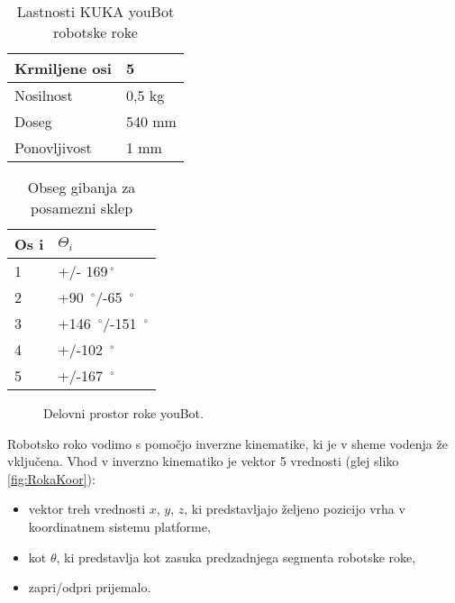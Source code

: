 \vspace{0.5cm}

\begin{table}
\caption{Lastnosti KUKA youBot robotske roke}
\begin{tabular}{|l|l|}
\hline Krmiljene osi & 5 \\
\hline Nosilnost &	0,5 kg \\
\hline Doseg &	540 mm \\
\hline Ponovljivost & 	1 mm \\ \hline
\end{tabular}
\end{table}


\begin{table}
\caption{Obseg gibanja za posamezni sklep}
\begin{tabular}{|l|l|}
\hline Os i & $\Theta_i$ \\
\hline 1 &	+/- 169$\,^{\circ}$ \\
\hline 2 &	+90 $\,^{\circ}$/-65 $\,^{\circ}$ \\
\hline 3 & 	+146 $\,^{\circ}$/-151 $\,^{\circ}$ \\
\hline 4 & 	+/-102 $ \,^{\circ}$ \\
\hline 5 & 	+/-167 $ \,^{\circ}$ \\ \hline
\end{tabular}
\end{table}

\vspace{0.5cm}

\begin{figure}[h]
\centering {}
\caption{Delovni prostor roke youBot.}
\end{figure}

Robotsko roko vodimo s pomočjo inverzne kinematike, ki je v sheme vodenja že vključena. Vhod v inverzno kinematiko je vektor 5 vrednosti (glej sliko \ref{fig:RokaKoor}):
\begin{itemize}
\item vektor treh vrednosti $x$, $y$, $z$, ki predstavljajo željeno pozicijo vrha v koordinatnem sistemu platforme,
\item kot $\theta$, ki predstavlja kot zasuka predzadnjega segmenta robotske roke,
\item zapri/odpri prijemalo.
\end{itemize}


